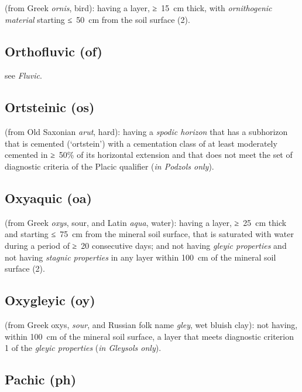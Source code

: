 \documentclass[
  letterpaper,
  DIV=11,
  numbers=noendperiod]{scrreprt}
\begin{document}
(from Greek \emph{ornis}, bird): having a layer, ≥~15~cm thick, with
\emph{ornithogenic material} starting ≤~50~cm from the soil surface (2).

\hypertarget{orthofluvic-of-1}{%
\subsection{Orthofluvic (of)}\label{orthofluvic-of-1}}

see \emph{Fluvic}.

\hypertarget{ortsteinic-os}{%
\subsection{Ortsteinic (os)}\label{ortsteinic-os}}

(from Old Saxonian \emph{arut}, hard): having a \emph{spodic horizon}
that has a subhorizon that is cemented (`ortstein') with a cementation
class of at least moderately cemented in ≥~50\% of its horizontal
extension and that does not meet the set of diagnostic criteria of the
Placic qualifier (\emph{in Podzols only}).

\hypertarget{oxyaquic-oa}{%
\subsection{Oxyaquic (oa)}\label{oxyaquic-oa}}

(from Greek \emph{oxys}, sour, and Latin \emph{aqua}, water): having a
layer, ≥~25~cm thick and starting ≤~75~cm from the mineral soil surface,
that is saturated with water during a period of ≥~20 consecutive days;
and not having \emph{gleyic properties} and not having \emph{stagnic
properties} in any layer within 100~cm of the mineral soil surface (2).

\hypertarget{oxygleyic-oy}{%
\subsection{Oxygleyic (oy)}\label{oxygleyic-oy}}

(from Greek oxys, \emph{sour}, and Russian folk name \emph{gley}, wet
bluish clay): not having, within 100~cm of the mineral soil surface, a
layer that meets diagnostic criterion 1 of the \emph{gleyic properties}
(\emph{in Gleysols only}).

\hypertarget{pachic-ph}{%
\subsection{Pachic (ph)}\label{pachic-ph}}
\end{document}
